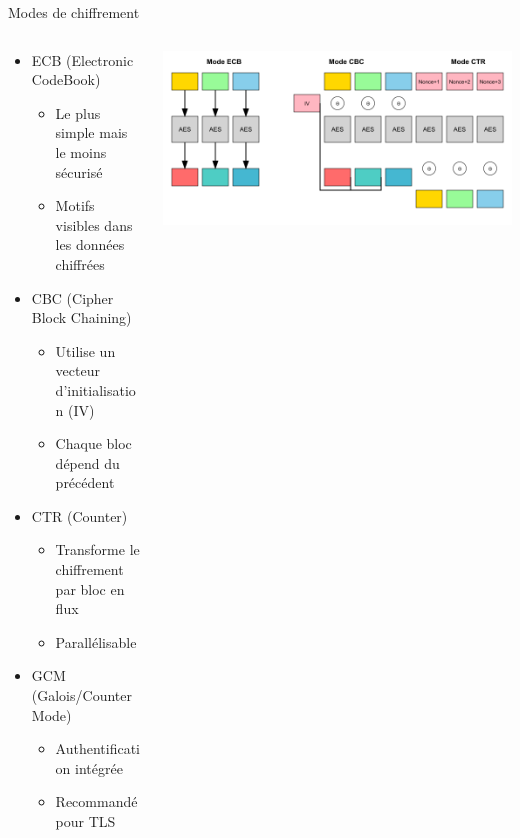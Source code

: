 \begin{frame}{Modes de chiffrement}
  \begin{columns}
    \begin{column}{0.6\textwidth}
      \begin{itemize}
        \item ECB (Electronic CodeBook)
          \begin{itemize}
            \item Le plus simple mais le moins sécurisé
            \item Motifs visibles dans les données chiffrées
          \end{itemize}
        \item CBC (Cipher Block Chaining)
          \begin{itemize}
            \item Utilise un vecteur d'initialisation (IV)
            \item Chaque bloc dépend du précédent
          \end{itemize}
        \item CTR (Counter)
          \begin{itemize}
            \item Transforme le chiffrement par bloc en flux
            \item Parallélisable
          \end{itemize}
        \item GCM (Galois/Counter Mode)
          \begin{itemize}
            \item Authentification intégrée
            \item Recommandé pour TLS
          \end{itemize}
      \end{itemize}
    \end{column}
    \begin{column}{0.4\textwidth}
      \begin{center}
        \includegraphics[width=\textwidth]{img/encryption-modes.png}
      \end{center}
    \end{column}
  \end{columns}
\end{frame}


